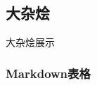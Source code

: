 \documentclass[UTF8]{ctexart}
\begin{document}
  \subsection{大杂烩}
  {\color{blue}大杂烩展示}



\subsubsection{Markdown表格}
\end{document}
